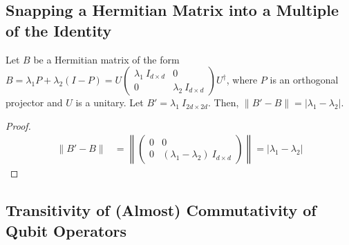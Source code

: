 \subsection{Snapping a Hermitian Matrix into a Multiple of the Identity}
\begin{theorem}
\label{lemma:snapping-hermitian-qubit-hermitian-operator}
Let $B$ be a Hermitian matrix of the form $B = \lambda_1 P + \lambda_2 (I - P) = U \begin{pmatrix}
        \lambda_1\: I_{d \times d} & 0\\ 0 & \lambda_2\: I_{d \times d}
    \end{pmatrix} U^\dagger$, where $P$ is an orthogonal projector and $U$ is a unitary. Let
    $B' = \lambda_1\: I_{2d \times 2d}$.
Then, $\|B' - B \| = |\lambda_1 - \lambda_2|$.
\end{theorem}

\begin{proof}
\begin{align*}
\|B' - B \| &= \left\|\begin{pmatrix}
        0 & 0\\ 0 & \left(\lambda_1 - \lambda_2\right)\: I_{d \times d}
    \end{pmatrix}\right\| = |\lambda_1 - \lambda_2|
\end{align*}
\end{proof}
\subsection{Transitivity of (Almost) Commutativity of Qubit Operators}

